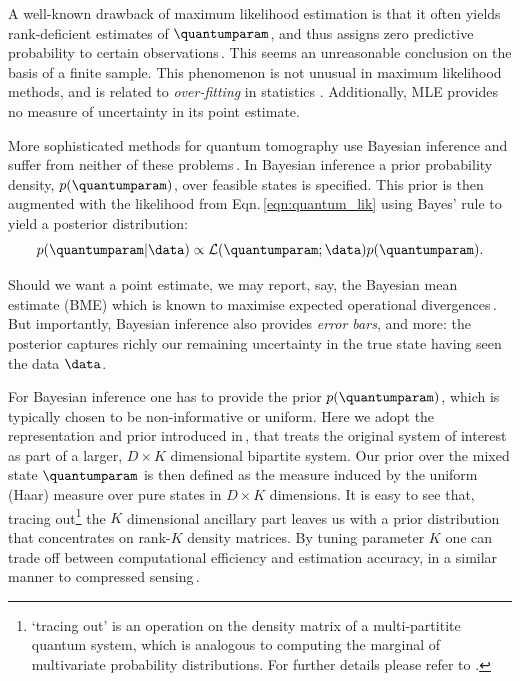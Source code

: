 A well-known drawback of maximum likelihood estimation is that it often yields rank-deficient estimates of $\quantumparam$, and thus assigns zero predictive probability to certain observations\,\citep{BayesianTomography}. This seems an unreasonable conclusion on the basis of a finite sample. This phenomenon is not unusual in maximum likelihood methods, and is related to \emph{over-fitting} in statistics \citep{Hawkins2004}. Additionally, MLE provides no measure of uncertainty in its point estimate.

More sophisticated methods for quantum tomography use Bayesian inference and suffer from neither of these problems\,\cite[][and refs.]{BayesianTomography}. In Bayesian inference a prior probability density, $p(\quantumparam)$, over feasible states is specified. This prior is then augmented with the likelihood from Eqn.\,\eqref{eqn:quantum_lik} using Bayes' rule to yield a posterior distribution:
%
\begin{equation}
	\label{eqn:quantum_bayes}
	p(\quantumparam\vert\data)\propto \mathcal{L}(\quantumparam;\data)p(\quantumparam).
\end{equation}

Should we want a point estimate, we may report, say, the Bayesian mean estimate (BME) which is known to maximise expected operational divergences\,\citep{BayesianTomography,BayesianOptimality}. But importantly, Bayesian inference also provides \emph{error bars}, and more: the posterior captures richly our remaining uncertainty in the true state having seen the data $\data$. 

For Bayesian inference one has to provide the prior $p(\quantumparam)$, which is typically chosen to be non-informative or uniform. Here we adopt the representation and prior introduced in\,\citep{BayesianTomography}, that treats the original system of interest as part of a larger, $D \times K$ dimensional bipartite system. Our prior over the mixed state $\quantumparam$ is then defined as the measure induced by the uniform (Haar) measure over pure states in $D\times K$ dimensions. It is easy to see that, tracing out\footnote{`tracing out' is an operation on the density matrix of a multi-partitite quantum system, which is analogous to computing the marginal of multivariate probability distributions. For further details please refer to \citep{BayesianTomography}.} the $K$ dimensional ancillary part leaves us with a prior distribution that concentrates on rank-$K$ density matrices. By tuning parameter $K$ one can trade off between computational efficiency and estimation accuracy, in a similar manner to compressed sensing\,\citep{CompressedSensing}.

